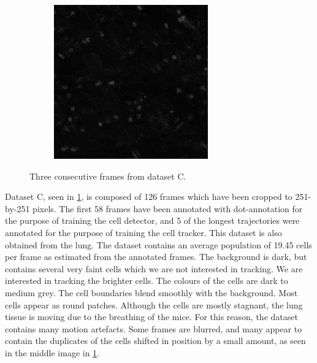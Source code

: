 \begin{figure}[h]
\begin{subfigure}{.32\textwidth}
    	\end{subfigure}
   		\hfill
  	    \begin{subfigure}{.32\textwidth}
   	  		\includegraphics[width=\textwidth]{images/series13greencropped010}
  	    \end{subfigure}
    	\caption{Three consecutive frames from dataset C.}
    	\label{fig:data_datasetC}
    \end{figure}
        
    Dataset C, seen in \cref{fig:data_datasetC}, is composed of 126 frames which have been cropped to 251-by-251 pixels. The first 58 frames have been annotated with dot-annotation for the purpose of training the cell detector, and 5 of the longest trajectories were annotated for the purpose of training the cell tracker. This dataset is also obtained from the lung. The dataset contains an average population of 19.45 cells per frame as estimated from the annotated frames. The background is dark, but contains several very faint cells which we are not interested in tracking. We are interested in tracking the brighter cells. The colours of the cells are dark to medium grey. The cell boundaries blend smoothly with the background. Most cells appear as round patches. Although the cells are mostly stagnant, the lung tissue is moving due to the breathing of the mice. For this reason, the dataset contains many motion artefacts. Some frames are blurred, and many appear to contain the duplicates of the cells shifted in position by a small amount, as seen in the middle image in \cref{fig:data_datasetC}.

